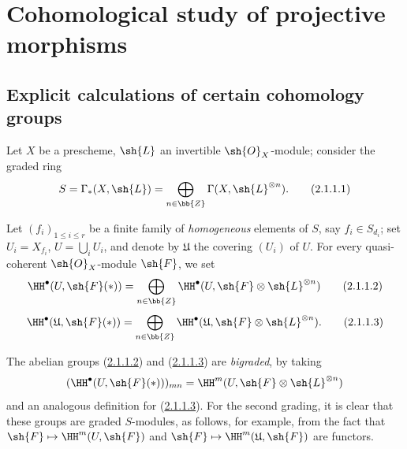 \section{Cohomological study of projective morphisms}
\label{section:III.2}


\subsection{Explicit calculations of certain cohomology groups}
\label{subsection:III.2.1}

\begin{env}[2.1.1]
\label{III.2.1.1}
Let $X$ be a prescheme, $\sh{L}$ an invertible $\sh{O}_X$-module; consider the graded ring 
\[
\label{III.2.1.1.1}
  S = \Gamma_*(X,\sh{L}) = \bigoplus_{n\in\bb{Z}} \Gamma(X,\sh{L}^{\otimes n}).
  \tag{2.1.1.1}
\]

Let $(f_i)_{1\leq i\leq r}$ be a finite family of \emph{homogeneous} elements of $S$, say $f_i\in S_{d_i}$; set $U_i = X_{f_i}$, $U = \bigcup_i U_i$, and denote by $\mathfrak{U}$ the covering $(U_i)$ of $U$.
For every quasi-coherent $\sh{O}_X$-module $\sh{F}$, we set
\[
\label{III.2.1.1.2}
  \HH^\bullet(U,\sh{F}(*)) = \bigoplus_{n\in\bb{Z}} \HH^\bullet(U,\sh{F}\otimes\sh{L}^{\otimes n})
  \tag{2.1.1.2}
\]
\[
\label{III.2.1.1.3}
  \HH^\bullet(\mathfrak{U},\sh{F}(*)) = \bigoplus_{n\in\bb{Z}} \HH^\bullet(\mathfrak{U},\sh{F}\otimes\sh{L}^{\otimes n}).
  \tag{2.1.1.3}
\]

The abelian groups (\hyperref[III.2.1.1.2]{2.1.1.2}) and (\hyperref[III.2.1.1.3]{2.1.1.3}) are \emph{bigraded}, by taking
\[
  (\HH^\bullet(U,\sh{F}(*)))_{mn} = \HH^m(U,\sh{F}\otimes\sh{L}^{\otimes n})
\]
and an analogous definition for (\hyperref[III.2.1.1.3]{2.1.1.3}).
For the second grading, it is clear that these groups are graded $S$-modules, as follows, for example, from the fact that $\sh{F}\mapsto\HH^m(U,\sh{F})$ and $\sh{F}\mapsto\HH^m(\mathfrak{U},\sh{F})$ are functors.
\end{env}

